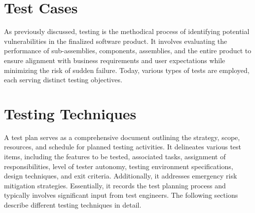 \documentclass[12pt,a4paper]{report}
\begin{document}
\section{Test Cases}
As previously discussed, testing is the methodical process of identifying potential vulnerabilities in the finalized software product. It involves evaluating the performance of sub-assemblies, components, assemblies, and the entire product to ensure alignment with business requirements and user expectations while minimizing the risk of sudden failure. Today, various types of tests are employed, each serving distinct testing objectives.

\section{Testing Techniques}
A test plan serves as a comprehensive document outlining the strategy, scope, resources, and schedule for planned testing activities. It delineates various test items, including the features to be tested, associated tasks, assignment of responsibilities, level of tester autonomy, testing environment specifications, design techniques, and exit criteria. Additionally, it addresses emergency risk mitigation strategies. Essentially, it records the test planning process and typically involves significant input from test engineers. The following sections describe different testing techniques in detail.
\end{document}
